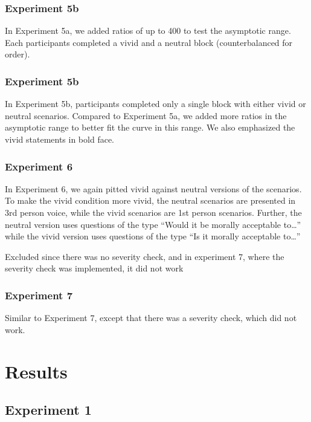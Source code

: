 \documentclass[
]{article}
\begin{document}
\subsubsection{Experiment 5b}\label{experiment-5b}

In Experiment 5a, we added ratios of up to 400 to test the asymptotic range. Each participants completed a vivid and a neutral block (counterbalanced for order).

\subsubsection{Experiment 5b}\label{experiment-5b-1}

In Experiment 5b, participants completed only a single block with either vivid or neutral scenarios. Compared to Experiment 5a, we added more ratios in the asymptotic range to better fit the curve in this range. We also emphasized the vivid statements in bold face.

\subsubsection{Experiment 6}\label{experiment-6}

In Experiment 6, we again pitted vivid against neutral versions of the scenarios. To make the vivid condition more vivid, the neutral scenarios are presented in 3rd person voice, while the vivid scenarios are 1st person scenarios. Further, the neutral version uses questions of the type ``Would it be morally acceptable to\ldots{}'' while the vivid version uses questions of the type ``Is it morally acceptable to\ldots{}''

Excluded since there was no severity check, and in experiment 7, where the severity check was implemented, it did not work

\subsubsection{Experiment 7}\label{experiment-7}

Similar to Experiment 7, except that there was a severity check, which did not work.

\clearpage

\section{Results}\label{results}

\subsection{Experiment 1}\label{experiment-1}
\end{document}
